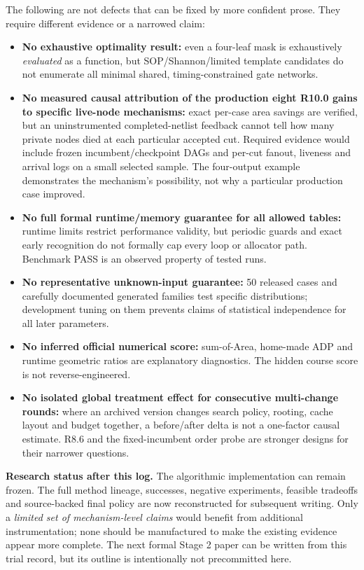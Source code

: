 \documentclass[a4paper,10pt]{article}
\providecommand{\tightlist}{\setlength{\itemsep}{0pt}\setlength{\parskip}{0pt}}
\theoremstyle{definition}
\theoremstyle{remark}
\begin{document}
The following are not defects that can be fixed by more confident prose. They require different evidence or a narrowed claim:

\begin{itemize}
\tightlist
\item
  \textbf{No exhaustive optimality result:} even a four-leaf mask is exhaustively \emph{evaluated} as a function, but SOP/Shannon/limited template candidates do not enumerate all minimal shared, timing-constrained gate networks.
\item
  \textbf{No measured causal attribution of the production eight R10.0 gains to specific live-node mechanisms:} exact per-case area savings are verified, but an uninstrumented completed-netlist feedback cannot tell how many private nodes died at each particular accepted cut. Required evidence would include frozen incumbent/checkpoint DAGs and per-cut fanout, liveness and arrival logs on a small selected sample. The four-output example demonstrates the mechanism's possibility, not why a particular production case improved.
\item
  \textbf{No full formal runtime/memory guarantee for all allowed tables:} runtime limits restrict performance validity, but periodic guards and exact early recognition do not formally cap every loop or allocator path. Benchmark PASS is an observed property of tested runs.
\item
  \textbf{No representative unknown-input guarantee:} 50 released cases and carefully documented generated families test specific distributions; development tuning on them prevents claims of statistical independence for all later parameters.
\item
  \textbf{No inferred official numerical score:} sum-of-Area, home-made ADP and runtime geometric ratios are explanatory diagnostics. The hidden course score is not reverse-engineered.
\item
  \textbf{No isolated global treatment effect for consecutive multi-change rounds:} where an archived version changes search policy, rooting, cache layout and budget together, a before/after delta is not a one-factor causal estimate. R8.6 and the fixed-incumbent order probe are stronger designs for their narrower questions.
\end{itemize}

\textbf{Research status after this log.} The algorithmic implementation can remain frozen. The full method lineage, successes, negative experiments, feasible tradeoffs and source-backed final policy are now reconstructed for subsequent writing. Only a \emph{limited set of mechanism-level claims} would benefit from additional instrumentation; none should be manufactured to make the existing evidence appear more complete. The next formal Stage 2 paper can be written from this trial record, but its outline is intentionally not precommitted here.
\end{document}
